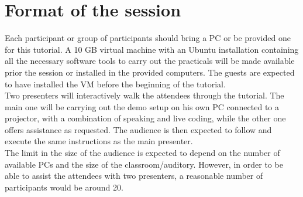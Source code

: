 \documentclass[
10pt, %
a4paper, %
oneside, %
BCOR5mm, %
]{scrartcl}
\begin{document}
\section{Format of the session}
\label{sec:format}
Each participant or group of participants should bring a PC or be provided one for this tutorial.
A 10 GB virtual machine with an Ubuntu installation containing all the necessary software tools to carry out the practicals will be made available prior the session or installed in the provided computers. 
The guests are expected to have installed the VM before the beginning of the tutorial.
\\
Two presenters will interactively walk the attendees through the tutorial. 
The main one will be carrying out the demo setup on his own PC connected to a projector, with a combination of speaking and live coding, while the other one offers assistance as requested. 
The audience is then expected to follow and execute the same instructions as the main presenter.
\\ 
The limit in the size of the audience is expected to depend on the number of available PCs and the size of the classroom/auditory.
However, in order to be able to assist the attendees with two presenters, a reasonable number of participants would be around 20.


\renewcommand{\refname}{\spacedlowsmallcaps{References}} %

% 




\end{document}

